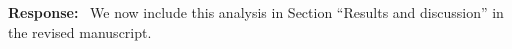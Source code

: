 \documentclass[11pt]{article}
\newenvironment{response}{\par\smallskip\noindent\color{resp}\textbf{Response:}\ }{\par}
\begin{document}
\begin{response}
We now include this analysis in Section ``Results and discussion'' in the revised manuscript.



%



\end{response}
\end{document}
